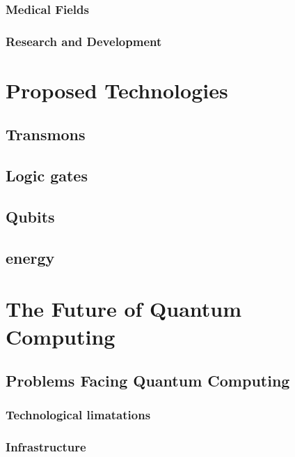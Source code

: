 \documentclass[journal]{IEEEtran}
\begin{document}
\subsubsection{Medical Fields}


\subsubsection{Research and Development }


\section{Proposed Technologies}


\subsection{Transmons}


\subsection{ Logic gates}\label{subsec: logicgates}


\subsection{Qubits}


\subsection{energy}\label{subsec:energy}



\section{The Future of Quantum Computing }


\subsection{Problems Facing Quantum Computing }


\subsubsection{Technological limatations  }


\subsubsection{Infrastructure}
\end{document}
